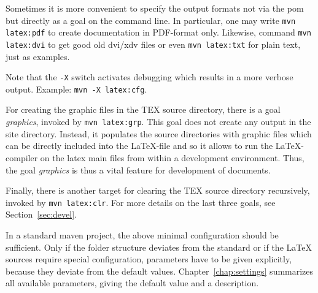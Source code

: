 Sometimes it is more convenient 
to specify the output formats not via the pom 
but directly as a goal on the command line. 
In particular, one may write \texttt{mvn latex:pdf} to create documentation 
in PDF-format only.
Likewise, command \texttt{mvn latex:dvi} to get good old dvi/xdv files
or even \texttt{mvn latex:txt} for plain text, just as examples. 

Note that the \texttt{-X} switch activates debugging 
which results in a more verbose output. 
Example: \texttt{mvn -X latex:cfg}. 




% 

For creating the graphic files in the TEX source directory, 
there is a goal \emph{graphics}, invoked by \texttt{mvn latex:grp}. 
This goal does not create any output in the site directory. 
Instead, it populates the source directories 
with graphic files which can be directly included into the \LaTeX-file 
and so it allows to run the \LaTeX-compiler on the latex main files 
from within a development environment. 
Thus, the goal \emph{graphics} is thus a vital feature 
for development of documents. 


Finally, there is another target for clearing the TEX source directory 
recursively, invoked by \texttt{mvn latex:clr}. 
For more details on the last three goals, see Section~\ref{sec:devel}. 

In a standard maven project, 
the above minimal configuration should be sufficient. 
Only if the folder structure deviates from the standard 
or if the \LaTeX{} sources require special configuration, 
parameters have to be given explicitly, 
because they deviate from the default values. 
Chapter~\ref{chap:settings} summarizes all available parameters, 
giving the default value and a description. 


